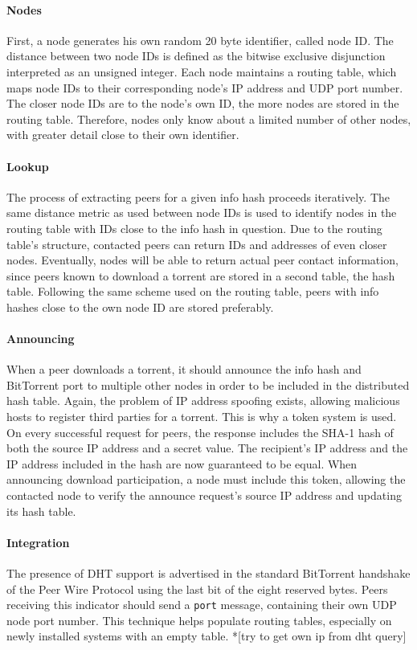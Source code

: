 \documentclass[10pt, a4paper, twoside, headsepline]{scrbook}
\renewcommand{\_}{\origunderscore\allowbreak}
\begin{document}
\paragraph{Nodes}
First, a node generates his own random 20 byte identifier, called node ID. The distance between two node IDs is defined as the bitwise exclusive disjunction interpreted as an unsigned integer. Each node maintains a routing table, which maps node IDs to their corresponding node's IP address and UDP port number. The closer node IDs are to the node's own ID, the more nodes are stored in the routing table. Therefore, nodes only know about a limited number of other nodes, with greater detail close to their own identifier.

\paragraph{Lookup}
The process of extracting peers for a given info hash proceeds iteratively. The same distance metric as used between node IDs is used to identify nodes in the routing table with IDs close to the info hash in question. Due to the routing table's structure, contacted peers can return IDs and addresses of even closer nodes. Eventually, nodes will be able to return actual peer contact information, since peers known to download a torrent are stored in a second table, the hash table. Following the same scheme used on the routing table, peers with info hashes close to the own node ID are stored preferably.

\paragraph{Announcing}
When a peer downloads a torrent, it should announce the info hash and BitTorrent port to multiple other nodes in order to be included in the distributed hash table. Again, the problem of IP address spoofing exists, allowing malicious hosts to register third parties for a torrent. This is why a token system is used. On every successful request for peers, the response includes the SHA-1 hash of both the source IP address and a secret value. The recipient's IP address and the IP address included in the hash are now guaranteed to be equal. When announcing download participation, a node must include this token, allowing the contacted node to verify the announce request's source IP address and updating its hash table.

\paragraph{Integration}
The presence of DHT support is advertised in the standard BitTorrent handshake of the Peer Wire Protocol using the last bit of the eight reserved bytes. Peers receiving this indicator should send a \texttt{port} message, containing their own UDP node port number. This technique helps populate routing tables, especially on newly installed systems with an empty table. *[try to get own ip from dht query]
\end{document}
